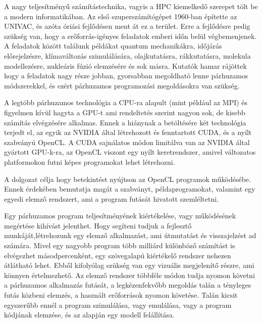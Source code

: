 
A nagy teljesítményű számítástechnika, vagyis a HPC kiemelkedő szerepet tölt be a modern informatikában. Az első szuperszámítógépet 1960-ban építette az UNIVAC, és azóta óriási fejlődésen ment át ez a terület. Erre a fejlődésre pedig szükség van, hogy a erőforrás-igényes feladatok emberi időn belül végbemenjenek. A feladatok között találunk példákat quantum mechanikákra, időjárás előrejelzésre, klímaváltozás szimulálására, olajkutatásra, rákkutatásra, molekula modellezésre, nukleáris fúzió elemzésére és sok másra. Kutatók hamar rájöttek hogy a feladatok nagy része jobban, gyorsabban megoldható lenne párhuzamos módszerekkel, és ezért párhuzamos programozási megoldásokra van szükség.

A legtöbb párhuzamos technológia a CPU-ra alapult (mint például az MPI) és figyelmen kívül hagyta a GPU-t ami rendeltetés szerint nagyon sok, de kisebb számítás elvégzésére alkalmas. Ennek a hiánynak a betöltésére két technológia terjedt el, az egyik az NVIDIA által létrehozott és fenntartott CUDA, és a nyílt szabványú OpenCL. A CUDA sajnálatos módon limitálva van az NVIDIA által gyártott GPU-k-ra, az OpenCL viszont egy nyílt keretrendszer, amivel változatos platformokon futni képes programokat lehet létrehozni.

 A dolgozat célja hogy betekintést nyújtson az OpenCL programok működésébe. Ennek érdekében bemutatja magát a szabványt, példaprogramokat, valamint egy egyedi elemző rendszert, ami a program futását hivatott szemléltetni.

Egy párhuzamos program teljesítményének kiértékelése, vagy működésének megértése kihívást jelenthet. Hogy segíteni tudjuk a fejlesztő munkáját,létrehozunk egy elemző alkalmazást, ami útmutatást és visszajelzést ad számára. Mivel egy nagyobb program több milliárd különböző számítást is elvégezhet másodpercenként, egy szövegalapú kiértékelő rendszer nehezen átlátható lehet. Ebből kifolyólag szükség van egy vizuális megjelenítő részre, ami könnyen értelmezhető. Az elemző rendszer többféle módon tudja nyomon követni a párhuzamos alkalmazás futását, a legkézenfekvőbb megoldás talán a tényleges futás közbeni elemzés, a használt erőforrások nyomon követése. Talán kicsit egyszerűbb ennél a program szimulálása, vagy emulálása, vagy a program kódjának elemzése, és az alapján egy modell felállítása.

